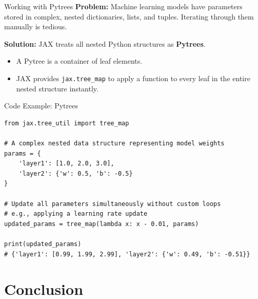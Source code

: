 \documentclass[aspectratio=169]{beamer}
\begin{document}
\begin{frame}{Working with Pytrees}
    \textbf{Problem:} Machine learning models have parameters stored in complex, nested dictionaries, lists, and tuples. Iterating through them manually is tedious.

    \vspace{0.3cm}
    \textbf{Solution:} JAX treats all nested Python structures as \textbf{Pytrees}.

    \vspace{0.3cm}
    \begin{itemize}
        \item A Pytree is a container of leaf elements.
        \item JAX provides \texttt{jax.tree\_map} to apply a function to every leaf in the entire nested structure instantly.
    \end{itemize}
\end{frame}

\begin{frame}[fragile]{Code Example: Pytrees}
    \begin{lstlisting}
from jax.tree_util import tree_map

# A complex nested data structure representing model weights
params = {
    'layer1': [1.0, 2.0, 3.0],
    'layer2': {'w': 0.5, 'b': -0.5}
}

# Update all parameters simultaneously without custom loops
# e.g., applying a learning rate update
updated_params = tree_map(lambda x: x - 0.01, params)

print(updated_params)
# {'layer1': [0.99, 1.99, 2.99], 'layer2': {'w': 0.49, 'b': -0.51}}
    \end{lstlisting}
\end{frame}

\section{Conclusion}
\end{document}
